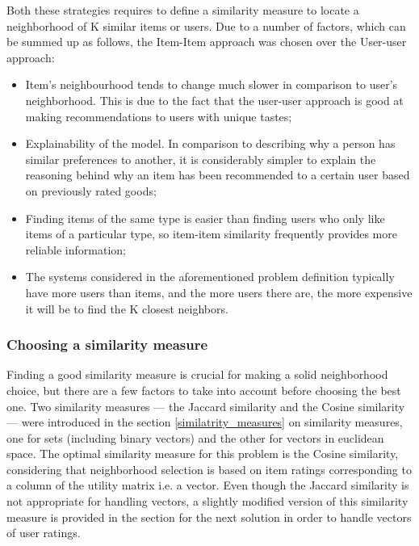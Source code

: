 Both these strategies requires to define a similarity measure to locate a neighborhood of K similar items or users. Due to a number of factors, which can be summed up as follows, the Item-Item approach was chosen over the User-user approach: 
\begin{itemize}
    \item Item's neighbourhood tends to change much slower in comparison to user's neighborhood. This is due to the fact that the user-user approach is good at making recommendations to users with unique tastes;
    \item Explainability of the model. In comparison to describing why a person has similar preferences to another, it is considerably simpler to explain the reasoning behind why an item has been recommended to a certain user based on previously rated goods; 
    \item Finding items of the same type is easier than finding users who only like items of a particular type, so item-item similarity frequently provides more reliable information;
    \item The systems considered in the aforementioned problem definition typically have more users than items, and the more users there are, the more expensive it will be to find the K closest neighbors. 
\end{itemize}

\subsubsection{Choosing a similarity measure}
\label{choosing_a_similarity_measure}
Finding a good similarity measure is crucial for making a solid neighborhood choice, but there are a few factors to take into account before choosing the best one. Two similarity measures — the Jaccard similarity and the Cosine similarity — were introduced in the section \ref{similatrity_measures} on similarity measures, one for sets (including binary vectors) and the other for vectors in euclidean space.
The optimal similarity measure for this problem is the Cosine similarity, considering that neighborhood selection is based on item ratings corresponding to a column of the utility matrix i.e. a vector.
Even though the Jaccard similarity is not appropriate for handling vectors, a slightly modified version of this similarity measure is provided in the section for the next solution in order to handle vectors of user ratings. 


